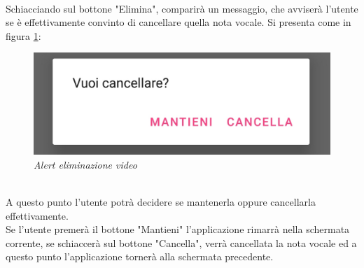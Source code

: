 \\Schiacciando sul bottone "Elimina", comparirà un messaggio, che avviserà l'utente se è effettivamente convinto di cancellare quella nota vocale. Si presenta come in figura \ref{fig:alertfoto}:
\begin{figure}[!h]
    \centering
	\includegraphics[scale=0.2]{Tesi/images/AlertFoto}
	\caption{\textit{Alert eliminazione video}}
	\label{fig:alertfoto}
\end{figure}
\\A questo punto l'utente potrà decidere se mantenerla oppure cancellarla effettivamente. 
\\Se l'utente premerà il bottone "Mantieni" l'applicazione rimarrà nella schermata corrente, se schiaccerà sul bottone "Cancella", verrà cancellata la nota vocale ed a questo punto l'applicazione tornerà alla schermata precedente.\pagebreak
